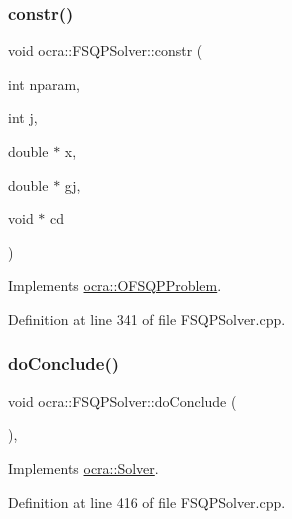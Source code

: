 \subsubsection{\texorpdfstring{constr()}{constr()}}
{\footnotesize\ttfamily void ocra\+::\+F\+S\+Q\+P\+Solver\+::constr (\begin{DoxyParamCaption}\item[{int}]{nparam,  }\item[{int}]{j,  }\item[{double $\ast$}]{x,  }\item[{double $\ast$}]{gj,  }\item[{void $\ast$}]{cd }\end{DoxyParamCaption})\hspace{0.3cm}{\ttfamily [virtual]}}



Implements \hyperlink{classocra_1_1OFSQPProblem_a2049a97008ac6eaa306c3cb05ef7d394}{ocra\+::\+O\+F\+S\+Q\+P\+Problem}.



Definition at line 341 of file F\+S\+Q\+P\+Solver.\+cpp.

\hypertarget{classocra_1_1FSQPSolver_a792dc111362746ea36b2789a5442100c}{}\label{classocra_1_1FSQPSolver_a792dc111362746ea36b2789a5442100c} 
\subsubsection{\texorpdfstring{do\+Conclude()}{doConclude()}}
{\footnotesize\ttfamily void ocra\+::\+F\+S\+Q\+P\+Solver\+::do\+Conclude (\begin{DoxyParamCaption}{ }\end{DoxyParamCaption})\hspace{0.3cm}{\ttfamily [protected]}, {\ttfamily [virtual]}}



Implements \hyperlink{classocra_1_1Solver_ac9d2d41d544b57a75e0d03db073d646e}{ocra\+::\+Solver}.



Definition at line 416 of file F\+S\+Q\+P\+Solver.\+cpp.

\hypertarget{classocra_1_1FSQPSolver_a94faaa47095bc05870c1b834621cf232}{}\label{classocra_1_1FSQPSolver_a94faaa47095bc05870c1b834621cf232} 
